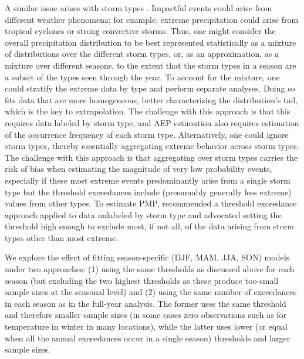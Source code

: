 \documentclass{ametsocV6.1}
\begin{document}
A similar issue arises with storm types \citep{nasem2024pmp}.
Impactful events could arise from different weather phenomena; for example, extreme precipitation could arise from tropical cyclones or strong convective storms. 
Thus, one might consider the overall precipitation distribution to be best represented statistically as a mixture of distributions over the different storm types, or, as an approximation, as a mixture over different seasons, to the extent that the storm types in a season are a subset of the types seen through the year.
To account for the mixture, one could stratify the extreme data by type and perform separate analyses. 
Doing so fits data that are more homogeneous, better characterizing the distribution's tail, which is the key to extrapolation. 
The challenge with this approach is that this requires data labeled by storm type, and AEP estimation also requires estimation of the occurrence frequency of each storm type.
Alternatively, one could ignore storm types, thereby essentially aggregating extreme behavior across storm types.
The challenge with this approach is that aggregating over storm types carries the risk of bias when estimating the magnitude of very low probability events, especially if these most extreme events predominantly arise from a single storm type but the threshold exceedances include (presumably generally less extreme) values from other types.
To estimate PMP, \citet{nasem2024pmp} recommended a threshold exceedance approach applied to data unlabeled by storm type and advocated setting the threshold high enough to exclude most, if not all, of the data arising from storm types other than most extreme.
 



We explore the effect of fitting season-specific (DJF, MAM, JJA, SON) models under two approaches: (1) using the same thresholds as discussed above for each season (but excluding the two highest thresholds as these produce too-small sample sizes at the seasonal level) %
and (2) using the same number of exceedances in each season as in the full-year analysis. The former uses the same threshold and therefore smaller sample sizes (in some cases zero observations such as for temperature in winter in many locations), while the latter uses lower (or equal when all the annual exceedances occur in a single season) thresholds and larger sample sizes.
\end{document}

